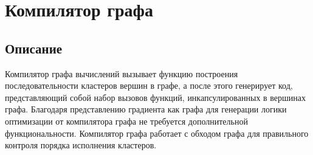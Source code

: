 \clearpage
\section{Компилятор графа}
\subsection{Описание}
Компилятор графа вычислений вызывает функцию построения последовательности кластеров вершин в графе, а после этого генерирует код, представляющий собой набор вызовов функций, инкапсулированных в вершинах графа. Благодаря представлению градиента как графа для генерации логики оптимизации от компилятора графа не требуется дополнительной функциональности. Компилятор графа работает с обходом графа для правильного контроля порядка исполнения кластеров.